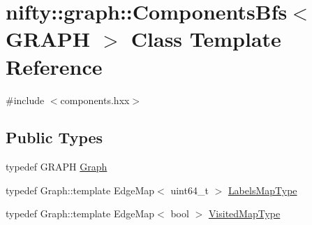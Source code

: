 \hypertarget{classnifty_1_1graph_1_1ComponentsBfs}{}\section{nifty\+:\+:graph\+:\+:Components\+Bfs$<$ G\+R\+A\+P\+H $>$ Class Template Reference}
\label{classnifty_1_1graph_1_1ComponentsBfs}


{\ttfamily \#include $<$components.\+hxx$>$}

\subsection*{Public Types}
\begin{DoxyCompactItemize}
\item 
typedef G\+R\+A\+P\+H \hyperlink{classnifty_1_1graph_1_1ComponentsBfs_a55dd18e0681b5eade08f755fe6e13625}{Graph}
\item 
typedef Graph\+::template Edge\+Map$<$ uint64\+\_\+t $>$ \hyperlink{classnifty_1_1graph_1_1ComponentsBfs_a65c914297d3391021f4aab53c04e5711}{Labels\+Map\+Type}
\item 
typedef Graph\+::template Edge\+Map$<$ bool $>$ \hyperlink{classnifty_1_1graph_1_1ComponentsBfs_a6305420bcb4dbc75af2a59445c266b05}{Visited\+Map\+Type}
\end{DoxyCompactItemize}

